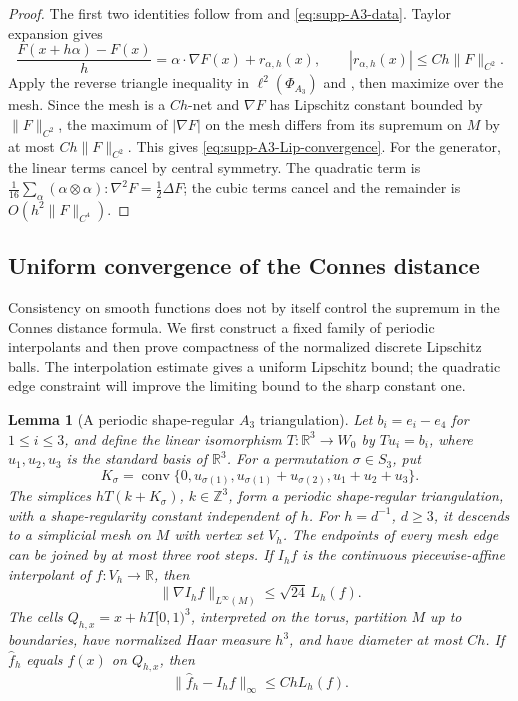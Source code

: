 \documentclass[11pt]{article}
\newtheorem{lemma}[lemma]{Lemma}
\theoremstyle{definition}
\theoremstyle{remark}
\theoremstyle{definition}
\theoremstyle{remark}
\newcommand{\norm}[1]{\lVert#1\rVert}
\begin{document}
\begin{proof}
The first two identities follow from  and
\eqref{eq:supp-A3-data}.  Taylor expansion gives
\[
 \frac{F(x+h\alpha)-F(x)}h
 =\alpha\cdot\nabla F(x)+r_{\alpha,h}(x),
 \qquad |r_{\alpha,h}(x)|\le Ch\norm F_{C^2}.
\]
Apply the reverse triangle inequality in $\ell^2(\Phi_{A_3})$ and
, then maximize over the mesh.  Since the mesh is a
$C h$-net and $\nabla F$ has Lipschitz constant bounded by $\|F\|_{C^2}$, the
maximum of $|\nabla F|$ on the mesh differs from its supremum on $M$ by at most
$C h\|F\|_{C^2}$.  This gives \eqref{eq:supp-A3-Lip-convergence}.  For the generator, the linear terms cancel
by central symmetry.  The quadratic term is
$\frac1{16}\sum_\alpha(\alpha\otimes\alpha):\nabla^2F=\frac12\Delta F$;
the cubic terms cancel and the remainder is $O(h^2\norm F_{C^4})$.
\end{proof}

\subsection{Uniform convergence of the Connes distance}
\label{subsec:A3-distance}

Consistency on smooth functions does not by itself control the supremum in
the Connes distance formula.  We first construct a fixed family of periodic
interpolants and then prove compactness of the normalized discrete Lipschitz
balls.  The interpolation estimate gives a uniform Lipschitz bound; the
quadratic edge constraint will improve the limiting bound to the sharp
constant one.

\begin{lemma}[A periodic shape-regular $A_3$ triangulation]
\label{lem:A3-periodic-triangulation}
Let $b_i=e_i-e_4$ for $1\le i\le3$, and define the linear isomorphism
$T:\mathbb R^3\to W_0$ by $T u_i=b_i$, where $u_1,u_2,u_3$ is the standard
basis of $\mathbb R^3$.  For a permutation $\sigma\in S_3$, put
\begin{equation}
 K_\sigma=\operatorname{conv}\{0,u_{\sigma(1)},
 u_{\sigma(1)}+u_{\sigma(2)},u_1+u_2+u_3\}.
 \label{eq:A3-reference-simplex}
\end{equation}
The simplices $hT(k+K_\sigma)$, $k\in\mathbb Z^3$, form a periodic
shape-regular triangulation, with a shape-regularity constant independent
of $h$.  For $h=d^{-1}$, $d\ge3$, it descends to a simplicial mesh on $M$
with vertex set $V_h$.  The endpoints of every mesh edge can be joined by
at most three root steps.  If $I_h f$ is the continuous piecewise-affine interpolant of
$f:V_h\to\mathbb R$, then
\begin{equation}
 \|\nabla I_h f\|_{L^\infty(M)}\le\sqrt{24}\,L_h(f).
 \label{eq:A3-interpolation-bound}
\end{equation}
The cells $Q_{h,x}=x+hT[0,1)^3$, interpreted on the torus, partition $M$
up to boundaries, have normalized Haar measure $h^3$, and have diameter
at most $C h$.  If $\widehat f_h$ equals $f(x)$ on $Q_{h,x}$, then
\begin{equation}
 \|\widehat f_h-I_h f\|_\infty\le C h L_h(f).
 \label{eq:A3-cell-interpolation-bound}
\end{equation}
\end{lemma}
\end{document}
